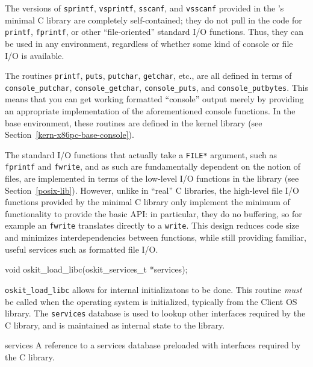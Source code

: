 \label{printf}

The versions of {\tt sprintf}, {\tt vsprintf},
{\tt sscanf}, and {\tt vsscanf}
provided in the \oskit{}'s minimal C library
are completely self-contained;
they do not pull in the code for {\tt printf}, {\tt fprintf},
or other ``file-oriented'' standard I/O functions.
Thus, they can be used in any environment,
regardless of whether some kind of console or file I/O is available.

The routines {\tt printf}, {\tt puts}, {\tt putchar}, {\tt getchar}, etc.,
are all defined in terms of {\tt console_putchar}, {\tt console_getchar},
{\tt console_puts}, and {\tt console_putbytes}. This means that you can get
working formatted ``console'' output merely by providing an appropriate
implementation of the aforementioned console functions. In the base
environment, these routines are defined in the kernel library (see
Section~\ref{kern-x86pc-base-console}).

The standard I/O functions that actually take a {\tt FILE*} argument,
such as {\tt fprintf} and {\tt fwrite},
and as such are fundamentally dependent on the notion of files,
are implemented in terms of the low-level I/O functions in the
\posix{} library (see Section~\ref{posix-lib}). However, unlike in ``real''
C libraries, the high-level file I/O functions provided by the minimal C
library only implement the minimum of functionality to provide the basic
API: in particular, they do no buffering, so for example an {\tt fwrite}
translates directly to a {\tt write}.  This design reduces code size and
minimizes interdependencies between functions, while still providing
familiar, useful services such as formatted file I/O.




\label{oskit-init-libc}
\begin{apisyn}

        \funcproto void oskit_load_libc(oskit_services_t *services);
\end{apisyn}
\begin{apidesc}
	\texttt{oskit_load_libc} allows for internal initializatons to be
	done. This routine \emph{must} be called when the operating system is
	initialized, typically from the Client OS library. The
	\texttt{services} database is used to lookup other interfaces
	required by the C library, and is maintained as internal state to
	the library. 
\end{apidesc}
\begin{apiparm}
	\item[services] A reference to a services database preloaded with
	interfaces required by the C library.
\end{apiparm}


